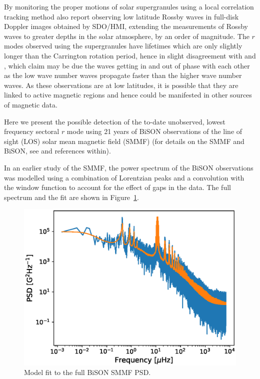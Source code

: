 By monitoring the proper motions of solar supergranules using a local correlation tracking method \citet{hathaway_hydrodynamic_2020} also report observing low latitude Rossby waves in full-disk Doppler images obtained by SDO/HMI, extending the measurements of Rossby waves to greater depths in the solar atmosphere, by an order of magnitude. The $r$ modes observed using the supergranules have lifetimes which are only slightly longer than the Carrington rotation period, hence in slight disagreement with \citet{loptien_global-scale_2018} and \citet{liang_time-distance_2019}, which \citet{hathaway_hydrodynamic_2020} claim may be due the waves getting in and out of phase with each other as the low wave number waves propagate faster than the higher wave number waves. As these observations are at low latitudes, it is possible that they are linked to active magnetic regions and hence could be manifested in other sources of magnetic data.

Here we present the possible detection of the to-date unobserved, lowest frequency sectoral $r$ mode using 21 years of BiSON observations of the line of sight (LOS) solar mean magnetic field (SMMF) (for details on the SMMF and BiSON, see \citet{chaplin_studies_2003} and references within).

In an earlier study of the SMMF, the power spectrum of the BiSON observations was modelled using a combination of Lorentzian peaks and a convolution with the window function to account for the effect of gaps in the data. The full spectrum and the fit are shown in Figure~\ref{fig:BiSON_PSD}.

\begin{figure}[!ht]
	\centering
	\includegraphics[width=0.7\columnwidth]{SMMF_PSD_fit.eps}
	\caption{Model fit to the full BiSON SMMF PSD.}
	\label{fig:BiSON_PSD}
\end{figure}

